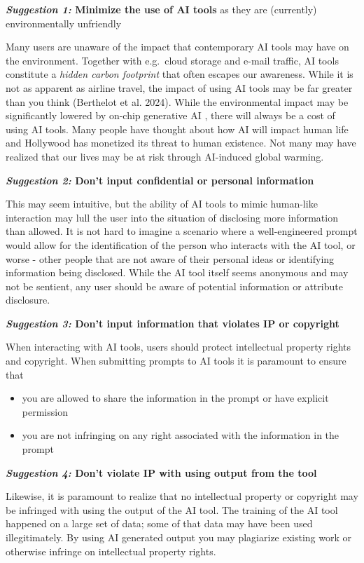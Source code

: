 \documentclass[
  letterpaper,
  DIV=11,
  numbers=noendperiod]{scrreprt}
\providecommand{\tightlist}{%
  \setlength{\itemsep}{0pt}\setlength{\parskip}{0pt}}\usepackage{longtable,booktabs,array}
\begin{document}
\textbf{\emph{Suggestion 1:} Minimize the use of AI tools} as they are
(currently) environmentally unfriendly

Many users are unaware of the impact that contemporary AI tools may have
on the environment. Together with e.g.~cloud storage and e-mail traffic,
AI tools constitute a \emph{hidden carbon footprint} that often escapes
our awareness. While it is not as apparent as airline travel, the impact
of using AI tools may be far greater than you think (Berthelot et al.
2024). While the environmental impact may be significantly lowered by
on-chip generative AI , there will always be a cost of using AI tools.
Many people have thought about how AI will impact human life and
Hollywood has monetized its threat to human existence. Not many may have
realized that our lives may be at risk through AI-induced global
warming.

\textbf{\emph{Suggestion 2:} Don't input confidential or personal
information}

This may seem intuitive, but the ability of AI tools to mimic human-like
interaction may lull the user into the situation of disclosing more
information than allowed. It is not hard to imagine a scenario where a
well-engineered prompt would allow for the identification of the person
who interacts with the AI tool, or worse - other people that are not
aware of their personal ideas or identifying information being
disclosed. While the AI tool itself seems anonymous and may not be
sentient, any user should be aware of potential information or attribute
disclosure.

\textbf{\emph{Suggestion 3:} Don't input information that violates IP or
copyright}

When interacting with AI tools, users should protect intellectual
property rights and copyright. When submitting prompts to AI tools it is
paramount to ensure that

\begin{itemize}
\tightlist
\item
  you are allowed to share the information in the prompt or have
  explicit permission
\item
  you are not infringing on any right associated with the information in
  the prompt
\end{itemize}

\textbf{\emph{Suggestion 4:} Don't violate IP with using output from the
tool}

Likewise, it is paramount to realize that no intellectual property or
copyright may be infringed with using the output of the AI tool. The
training of the AI tool happened on a large set of data; some of that
data may have been used illegitimately. By using AI generated output you
may plagiarize existing work or otherwise infringe on intellectual
property rights.
\end{document}
